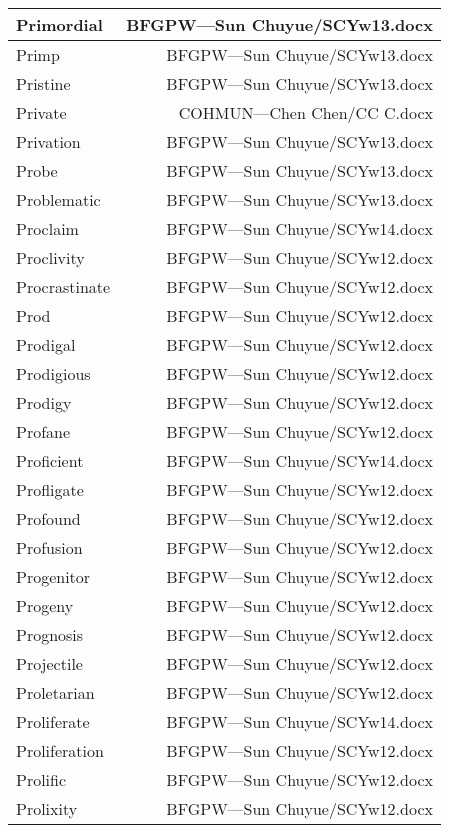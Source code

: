 \documentclass{article}
\begin{document}
\begin{center}
\begin{longtable}{|l|r|}
\hline
Primordial  &  BFGPW---Sun Chuyue/SCYw13.docx\\  
\hline
Primp  &  BFGPW---Sun Chuyue/SCYw13.docx\\  
\hline
Pristine  &  BFGPW---Sun Chuyue/SCYw13.docx\\  
\hline
Private  &  COHMUN---Chen Chen/CC C.docx\\  
\hline
Privation  &  BFGPW---Sun Chuyue/SCYw13.docx\\  
\hline
Probe  &  BFGPW---Sun Chuyue/SCYw13.docx\\  
\hline
Problematic  &  BFGPW---Sun Chuyue/SCYw13.docx\\  
\hline
Proclaim  &  BFGPW---Sun Chuyue/SCYw14.docx\\  
\hline
Proclivity  &  BFGPW---Sun Chuyue/SCYw12.docx\\  
\hline
Procrastinate  &  BFGPW---Sun Chuyue/SCYw12.docx\\  
\hline
Prod  &  BFGPW---Sun Chuyue/SCYw12.docx\\  
\hline
Prodigal  &  BFGPW---Sun Chuyue/SCYw12.docx\\  
\hline
Prodigious  &  BFGPW---Sun Chuyue/SCYw12.docx\\  
\hline
Prodigy  &  BFGPW---Sun Chuyue/SCYw12.docx\\  
\hline
Profane  &  BFGPW---Sun Chuyue/SCYw12.docx\\  
\hline
Proficient  &  BFGPW---Sun Chuyue/SCYw14.docx\\  
\hline
Profligate  &  BFGPW---Sun Chuyue/SCYw12.docx\\  
\hline
Profound  &  BFGPW---Sun Chuyue/SCYw12.docx\\  
\hline
Profusion  &  BFGPW---Sun Chuyue/SCYw12.docx\\  
\hline
Progenitor  &  BFGPW---Sun Chuyue/SCYw12.docx\\  
\hline
Progeny  &  BFGPW---Sun Chuyue/SCYw12.docx\\  
\hline
Prognosis  &  BFGPW---Sun Chuyue/SCYw12.docx\\  
\hline
Projectile  &  BFGPW---Sun Chuyue/SCYw12.docx\\  
\hline
Proletarian  &  BFGPW---Sun Chuyue/SCYw12.docx\\  
\hline
Proliferate  &  BFGPW---Sun Chuyue/SCYw14.docx\\  
\hline
Proliferation  &  BFGPW---Sun Chuyue/SCYw12.docx\\  
\hline
Prolific  &  BFGPW---Sun Chuyue/SCYw12.docx\\  
\hline
Prolixity  &  BFGPW---Sun Chuyue/SCYw12.docx\\  

\end{longtable}
\end{center}
\end{document}
